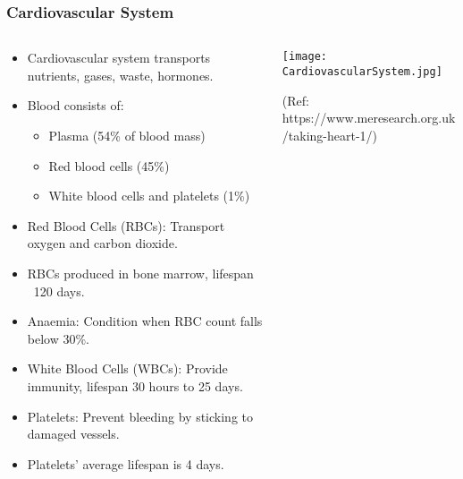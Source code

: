 \begin{frame}[fragile]\frametitle{Cardiovascular System}
\begin{columns}
    \begin{column}[T]{0.5\linewidth}
      \begin{itemize}
		\item Cardiovascular system transports nutrients, gases, waste, hormones.
		\item Blood consists of:
			\begin{itemize}
				\item Plasma (54\% of blood mass)
				\item Red blood cells (45\%)
				\item White blood cells and platelets (1\%)
			\end{itemize}
		\item Red Blood Cells (RBCs): Transport oxygen and carbon dioxide.
		\item RBCs produced in bone marrow, lifespan ~120 days.
		\item Anaemia: Condition when RBC count falls below 30\%.
		\item White Blood Cells (WBCs): Provide immunity, lifespan 30 hours to 25 days.
		\item Platelets: Prevent bleeding by sticking to damaged vessels.
		\item Platelets' average lifespan is 4 days.
	  \end{itemize}
    \end{column}
    \begin{column}[T]{0.5\linewidth}
		\begin{center}
		\texttt{[image: CardiovascularSystem.jpg]}
		
				
		{\tiny (Ref: https://www.meresearch.org.uk/taking-heart-1/)}		
		\end{center}	
    \end{column}
  \end{columns}
\end{frame}

